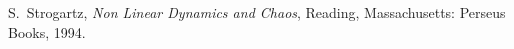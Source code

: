 \documentclass[10pt,journal,compsoc]{IEEEtran}
\begin{document}

%






% 
%
\begin{thebibliography}{1}

S.~Strogartz, \emph{Non Linear Dynamics and Chaos}, \relax Reading,
Massachusetts: Perseus Books, 1994.

\end{thebibliography}
\end{document}
